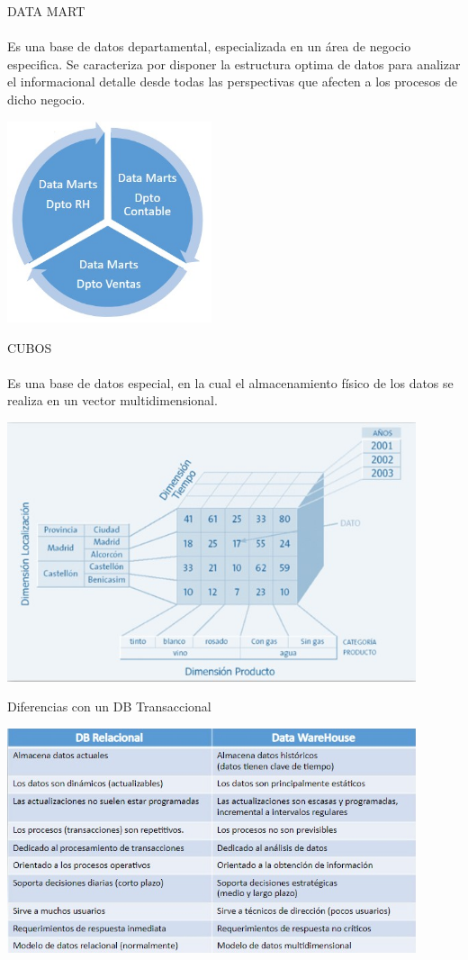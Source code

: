 \documentclass[preprint,12pt]{elsarticle}
\begin{document}
DATA MART\\
\\Es una base de datos departamental, especializada en un área de negocio especifica. Se caracteriza por disponer la estructura optima de datos para analizar el informacional detalle desde todas las perspectivas que afecten a los procesos de dicho negocio.

\begin{center}
	\includegraphics[width=6cm]{./Imagenes/imagen3} 
\end{center}

CUBOS\\
\\Es una base de datos especial, en la cual el almacenamiento físico de los datos se realiza en un vector multidimensional.
\begin{center}
	\includegraphics[width=12cm]{./Imagenes/imagen4} 
\end{center}

Diferencias con un DB Transaccional\\
\begin{center}
	\includegraphics[width=12cm]{./Imagenes/imagen5} 
\end{center}
\end{document}
